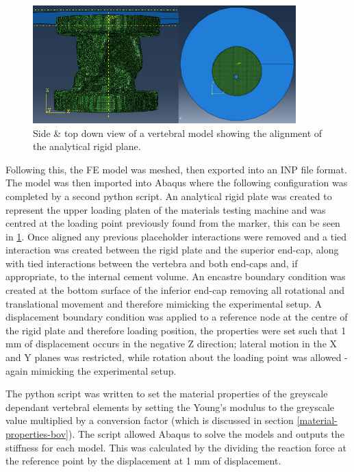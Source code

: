 \begin{figure}[ht!]
\centering

  \includegraphics[width=4in]{images/abaqus_side_view_Both.png}
  \caption{Side \& top down view of a vertebral model showing the alignment of the analytical rigid plane.}
\label{fig:abaqus_top_view}
\end{figure}


Following this, the FE model was meshed, then exported into an INP file format. The model was then imported into Abaqus where the following configuration was completed by a second python script. An analytical rigid plate was created to represent the upper loading platen of the materials testing machine and was centred at the loading point previously found from the marker, this can be seen in \cref{fig:abaqus_top_view}. Once aligned any previous placeholder interactions were removed and a tied interaction was created between the rigid plate and the superior end-cap, along with tied interactions between the vertebra and both end-caps and, if appropriate, to the internal cement volume. An encastre boundary condition was created at the bottom surface of the inferior end-cap removing all rotational and translational movement and therefore mimicking the experimental setup. A displacement boundary condition was applied to a reference node at the centre of the rigid plate and therefore loading position, the properties were set such that 1 mm of displacement occurs in the negative Z direction; lateral motion in the X and Y planes was restricted, while rotation about the loading point was allowed - again mimicking the experimental setup.

The python script was written to set the material properties of the greyscale dependant vertebral elements by setting the Young's modulus to the greyscale value multiplied by a conversion factor (which is discussed in section \ref{material-properties-bov}). The script allowed Abaqus to solve the models and outputs the stiffness for each model. This was calculated by the dividing the reaction force at the reference point by the displacement at 1 mm of displacement.

